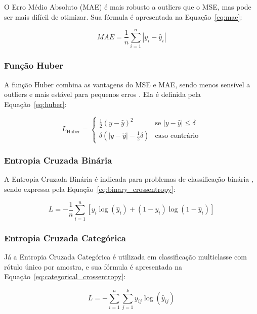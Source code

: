 O Erro Médio Absoluto (MAE) é mais robusto a outliers que o MSE, mas pode ser mais difícil de otimizar. Sua fórmula é apresentada na Equação~\ref{eq:mae}:

\begin{equation}
    MAE = \frac{1}{n} \sum_{i=1}^{n} |y_i - \hat{y}_i|
    \label{eq:mae}
\end{equation}

\subsubsection{Função Huber}

A função Huber combina as vantagens do MSE e MAE, sendo menos sensível a outliers e mais estável para pequenos erros \cite{huber1964robust}. Ela é definida pela Equação~\ref{eq:huber}:

\begin{equation}
    L_{\text{Huber}} =
    \begin{cases}
        \frac{1}{2}(y - \hat{y})^2 & \text{se } |y - \hat{y}| \leq \delta \\
        \delta (|y - \hat{y}| - \frac{1}{2} \delta) & \text{caso contrário}
    \end{cases}
    \label{eq:huber}
\end{equation}

\subsubsection{Entropia Cruzada Binária}

A Entropia Cruzada Binária é indicada para problemas de classificação binária \cite{zhang2018cross}, sendo expressa pela Equação~\ref{eq:binary_crossentropy}:

\begin{equation}
    L = -\frac{1}{n} \sum_{i=1}^{n} \left[y_i \log(\hat{y}_i) + (1 - y_i) \log(1 - \hat{y}_i)\right]
    \label{eq:binary_crossentropy}
\end{equation}

\subsubsection{Entropia Cruzada Categórica}

Já a Entropia Cruzada Categórica é utilizada em classificação multiclasse com rótulo único por amostra, e sua fórmula é apresentada na Equação~\ref{eq:categorical_crossentropy}:

\begin{equation}
    L = -\sum_{i=1}^{n} \sum_{j=1}^{k} y_{ij} \log(\hat{y}_{ij})
    \label{eq:categorical_crossentropy}
\end{equation}

